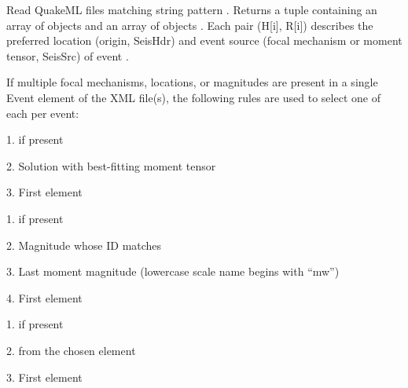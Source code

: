 \documentclass[letterpaper,11pt,english]{sphinxmanual}
\begin{document}
\begin{fulllineitems}
\end{fulllineitems}


Read QuakeML files matching string pattern . Returns a tuple containing
an array of  objects  and an array of  objects .
Each pair (H{[}i{]}, R{[}i{]}) describes the preferred location (origin, SeisHdr) and
event source (focal mechanism or moment tensor, SeisSrc) of event .

If multiple focal mechanisms, locations, or magnitudes are present in a single
Event element of the XML file(s), the following rules are used to select one of
each per event:

\begin{DUlineblock}{0em}
\item[] 
\item[]
\begin{DUlineblock}{\DUlineblockindent}
\item[] 1.  if present
\item[] 2. Solution with best-fitting moment tensor
\item[] 3. First  element
\item[] 
\end{DUlineblock}
\item[] 
\item[]
\begin{DUlineblock}{\DUlineblockindent}
\item[] 1.  if present
\item[] 2. Magnitude whose ID matches 
\item[] 3. Last moment magnitude (lowercase scale name begins with “mw”)
\item[] 4. First  element
\item[] 
\end{DUlineblock}
\item[] 
\item[]
\begin{DUlineblock}{\DUlineblockindent}
\item[] 1.  if present
\item[] 2.  from the chosen  element
\item[] 3. First  element
\end{DUlineblock}
\end{DUlineblock}
\end{document}
